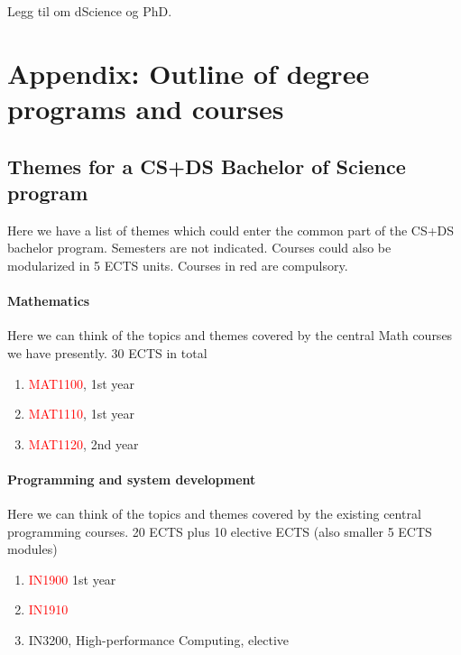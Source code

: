 \documentclass[oneside,final,10pt]{article}
\begin{document}
Legg til om dScience og PhD.  











\section*{Appendix:  Outline of degree programs and courses}

\subsection*{Themes for a CS+DS Bachelor of Science program}

Here we have a list of themes which could enter the common part of the CS+DS bachelor program.  
Semesters are not indicated. Courses could also be modularized in 5 ECTS units. Courses in red are compulsory.



\paragraph{Mathematics}
Here we can think of the topics and themes covered by the central  Math courses we have presently.
30 ECTS in total
\begin{enumerate}
\color{red}
    \item \textcolor{red}{MAT1100}, 1st year
    \item \textcolor{red}{MAT1110}, 1st year
    \item \textcolor{red}{MAT1120}, 2nd year
\end{enumerate}

\paragraph{Programming and system development}
Here we can think of the topics and themes covered by the existing central programming courses.
20 ECTS plus 10 elective ECTS (also smaller 5 ECTS modules)
\begin{enumerate}
    \item \textcolor{red}{IN1900} 1st year
    \item \textcolor{red}{IN1910}
    \item IN3200, High-performance Computing, elective
\end{enumerate}
\end{document}
